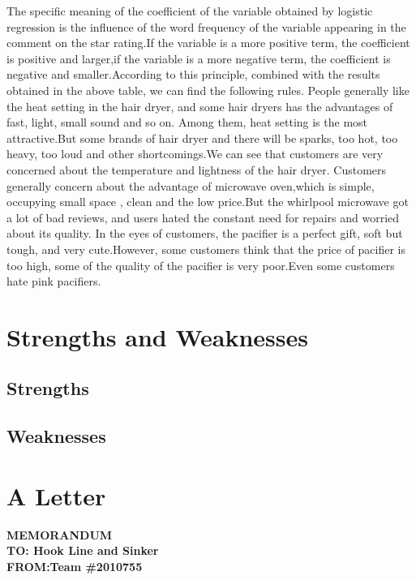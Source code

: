 \documentclass{mcmthesis}
\begin{document}
The specific meaning of the coefficient of the variable obtained by logistic regression is the
influence of the word frequency of the variable appearing in the comment on the star rating.If
the variable is a more positive term, the coefficient is positive and larger,if the variable is a more
negative term, the coefficient is negative and smaller.According to this principle, combined with
the results obtained in the above table, we can find the following rules.
People generally like the heat setting in the hair dryer, and some hair dryers has the advantages
of fast, light, small sound and so on. Among them, heat setting is the most attractive.But
some brands of hair dryer and there will be sparks, too hot, too heavy, too loud and other
shortcomings.We can see that customers are very concerned about the temperature and lightness
of the hair dryer.
Customers generally concern about the advantage of microwave oven,which is simple,
occupying small space , clean and the low price.But the whirlpool microwave got a lot of bad
reviews, and users hated the constant need for repairs and worried about its quality.
In the eyes of customers, the pacifier is a perfect gift, soft but tough, and very cute.However,
some customers think that the price of pacifier is too high, some of the quality of the pacifier is
very poor.Even some customers hate pink pacifiers.


\section{Strengths and Weaknesses}
\subsection{Strengths}



\subsection{Weaknesses}


\section{A Letter}
\textbf{MEMORANDUM}~\\
\textbf{TO: Hook Line and Sinker}\\
\textbf{FROM:Team \#2010755}\\
\end{document}

